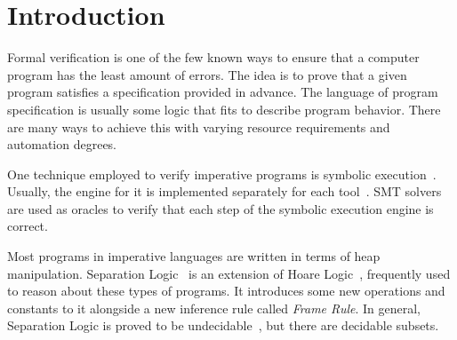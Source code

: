 \documentclass[sigplan,screen,review]{acmart}
\begin{document}



\maketitle


\newcommand{\EM}[1]{\ensuremath{#1}}
\newcommand{\ssymbol}[1]{\EM{#1}}
\newcommand{\bnfdef}{\EM{\vcentcolon\vcentcolon=}}
\newcommand{\emphbf}[1]{\textbf{\emph{#1}}}
\newcommand{\spmid}{\EM{\ \mid \ }}
\newcommand{\vsample}[1]{\EM{\mathit{sample}(#1)}}
\newcommand{\vconst}{\EM{\mathsf{c}}}
\newcommand{\anyval}{\ssymbol{v}}
\newcommand{\anydist}{\ssymbol{d}}
\newcommand{\dnormal}[2]{\EM{\mathit{Normal}(#1,#2)}}
\newcommand{\duniform}[2]{\EM{\mathit{Uniform}(#1,#2)}}

\section{Introduction} 

Formal verification is one of the few known ways to ensure that a computer program has the least amount of errors. The idea is to prove that a given program satisfies a specification provided in advance. The language of program specification is usually some logic that fits to describe program behavior. There are many ways to achieve this with varying resource requirements and automation degrees.

One technique employed to verify imperative programs is symbolic execution~\cite{berdine2005symbolic}. Usually, the engine for it is implemented separately for each tool~\cite{berdine2006smallfoot,distefano2008jstar}. SMT solvers are used as oracles to verify that each step of the symbolic execution engine is correct. 

Most programs in imperative languages are written in terms of heap manipulation. Separation Logic~\cite{o2019separation} is an extension of Hoare Logic~\cite{hoare1969axiomatic}, frequently used to reason about these types of programs. It introduces some new operations and constants to it alongside a new inference rule called \emph{Frame Rule}. In general, Separation Logic is proved to be undecidable~\cite{brotherston2010undecidability}, but there are decidable subsets.
\end{document}
